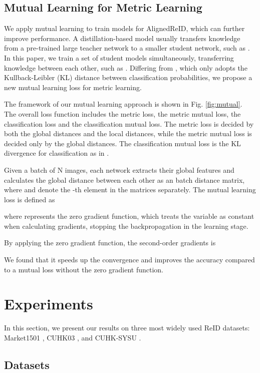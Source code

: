 \documentclass[10pt,twocolumn,letterpaper]{article}
\begin{document}
\subsection{Mutual Learning for Metric Learning}
We apply mutual learning to train models for AlignedReID, which can further improve performance.
A distillation-based model usually transfers knowledge from a pre-trained large teacher network to a smaller student network, such as \cite{chen2017darkrank}.
In this paper, we train a set of student models simultaneously, transferring knowledge between each other, such as \cite{zhang2017deep}.
Differing from \cite{zhang2017deep}, which only adopts the Kullback-Leibler (KL) distance between classification probabilities, we propose a new mutual learning loss for metric learning.

The framework of our mutual learning approach is shown in Fig. \ref{fig:mutual}.
The overall loss function includes the metric loss, the metric mutual loss, the classification loss and the classification mutual loss.
The metric loss is decided by both the global distances and the local distances, while
the metric mutual loss is decided only by the global distances.
The classification mutual loss is the KL divergence for classification as in \cite{zhang2017deep}.

Given a batch of N images, each network extracts their global features and calculates the global distance between each other as an  batch distance matrix,
where  and  denote the -th element in the matrices separately.
The mutual learning loss is defined as

where  represents the zero gradient function, which treats the variable as constant when calculating gradients, stopping the backpropagation in the learning stage.

By applying the zero gradient function, the second-order gradients is

We found that it speeds up the convergence and improves the accuracy compared to a mutual loss without the zero gradient function.



\section{Experiments}
\label{experiments}
In this section, we present our results on three most widely used ReID datasets: Market1501 \cite{zheng2015scalable}, CUHK03 \cite{Li2014DeepReID}, and CUHK-SYSU \cite{xiao2016end}.
\subsection{Datasets}
\end{document}
